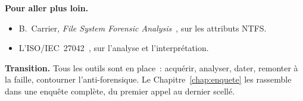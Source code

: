 \bigskip

\begin{boxinfo}
\textbf{Pour aller plus loin.}
\begin{itemize}
    \item B.~Carrier, \textit{File System Forensic
          Analysis}~\cite{carrier2005}, sur les attributs NTFS.
    \item L'ISO/IEC~27042~\cite{iso27042_2015}, sur l'analyse et
          l'interprétation.
\end{itemize}
\end{boxinfo}

\begin{boxinfo}
\textbf{Transition.} Tous les outils sont en place~: acquérir, analyser,
dater, remonter à la faille, contourner l'anti-forensique. Le
Chapitre~\ref{chap:enquete} les rassemble dans une enquête complète, du
premier appel au dernier scellé.
\end{boxinfo}
